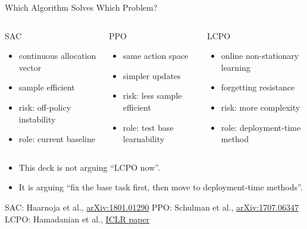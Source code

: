 \documentclass[10pt,aspectratio=169]{beamer}
\begin{document}
\begin{frame}{Which Algorithm Solves Which Problem?}
  \begin{columns}[T,onlytextwidth]
      \begin{block}{SAC}
        \begin{itemize}
          \item continuous allocation vector
          \item sample efficient
          \item risk: off-policy instability
          \item role: current baseline
        \end{itemize}
      \end{block}
      \begin{block}{PPO}
        \begin{itemize}
          \item same action space
          \item simpler updates
          \item risk: less sample efficient
          \item role: test base learnability
        \end{itemize}
      \end{block}
      \begin{block}{LCPO}
        \begin{itemize}
          \item online non-stationary learning
          \item forgetting resistance
          \item risk: more complexity
          \item role: deployment-time method
        \end{itemize}
      \end{block}
  \end{columns}

  \vspace{0.4em}
  \begin{itemize}
    \item This deck is not arguing ``LCPO now''.
    \item It is arguing ``fix the base task first, then move to deployment-time methods''.
  \end{itemize}

  \vspace{0.2em}
  {\tiny SAC: Haarnoja et al., \href{https://arxiv.org/abs/1801.01290}{arXiv:1801.01290} \hspace{1em}
  PPO: Schulman et al., \href{https://arxiv.org/abs/1707.06347}{arXiv:1707.06347} \hspace{1em}
  LCPO: Hamadanian et al., \href{https://lcpo.csail.mit.edu/content/lcpo-iclr.pdf}{ICLR paper}}
\end{frame}
\end{document}
